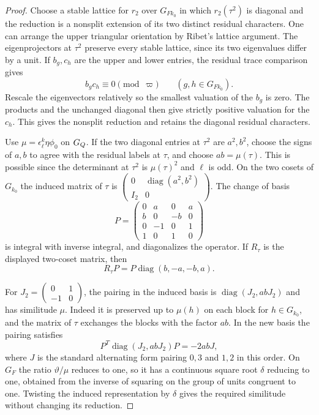 \begin{proof}

Choose a stable lattice for \(r_2\) over \(G_{Fk_0}\)
in which \(r_2(\tau^2)\) is diagonal and the reduction
is a nonsplit extension of its two distinct residual
characters. One can arrange the upper triangular
orientation by Ribet's lattice argument. The eigenprojectors at \(\tau^2\) preserve every stable
lattice, since its two eigenvalues differ by a unit. If \(b_g,c_h\)
are the upper and lower entries, the residual trace comparison gives
\[
                        b_g c_h\equiv0\pmod\varpi
                        \qquad(g,h\in G_{Fk_0}).
\]
Rescale the eigenvectors relatively so the smallest valuation
of the \(b_g\) is zero. The products and the unchanged diagonal
then give strictly positive valuation for the \(c_h\).
This gives the nonsplit reduction and retains the
diagonal residual characters.


Use \(\mu=\epsilon_\ell^k\eta\phi_0\) on \(G_Q\).
If the two diagonal entries at \(\tau^2\) are \(a^2,b^2\),
choose the signs of \(a,b\) to agree with the residual
labels at \(\tau\), and choose \(ab=\mu(\tau)\). This is
possible since the determinant at \(\tau^2\) is
\(\mu(\tau)^2\) and \(\ell\) is odd. On the two cosets of
\(G_{k_0}\) the induced matrix of \(\tau\) is
\(\left(\begin{smallmatrix}0&\operatorname{diag}(a^2,b^2)\\
I_2&0\end{smallmatrix}\right)\). The change of basis
\[
 P=\begin{pmatrix}
 0&a&0&a\\
 b&0&-b&0\\
 0&-1&0&1\\
 1&0&1&0
 \end{pmatrix}
\]
is integral with inverse integral, and diagonalizes the
operator. If \(R_\tau\) is the displayed two-coset matrix, then
\[
                       R_\tau P=P\operatorname{diag}(b,-a,-b,a).
\]

For \(J_2=\left(\begin{smallmatrix}0&1\\-1&0\end{smallmatrix}\right)\),
the pairing in the induced basis is \(\operatorname{diag}(J_2,abJ_2)\)
and has similitude \(\mu\). Indeed it is
preserved up to \(\mu(h)\) on each block for
\(h\in G_{k_0}\), and the matrix of \(\tau\) exchanges
the blocks with the factor \(ab\). In the new basis the pairing satisfies
\[
       P^{T}\operatorname{diag}(J_2,abJ_2)P=-2abJ,
\]
where \(J\) is the standard alternating form pairing \(0,3\)
and \(1,2\) in this order.
On \(G_F\) the ratio \(\vartheta/\mu\) reduces to one,
so it has a continuous square root \(\delta\) reducing
to one, obtained from the inverse of squaring on the
group of units congruent to one. Twisting the induced
representation by \(\delta\) gives the required
similitude without changing its reduction.


\end{proof}
